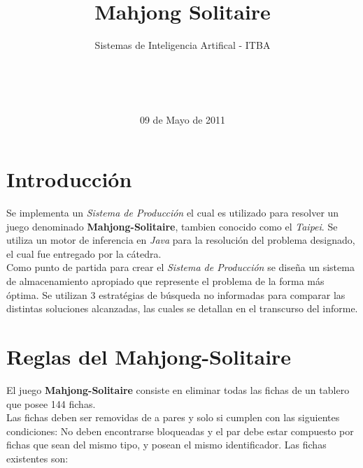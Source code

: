 \documentclass{sig-alternate}
\begin{document}

\title{Mahjong Solitaire}
\subtitle{Sistemas de Inteligencia Artifical - ITBA}


\author{
	\\
	\\
	\\
}

\date{09 de Mayo de 2011}

\maketitle

\section*{Introducci\'on}
	Se implementa un \textit{Sistema de Producci\'on} el cual es utilizado para resolver un juego denominado \textbf{Mahjong-Solitaire}, tambien conocido como el \textit{Taipei}. Se utiliza un motor de inferencia en \textit{Java} para la resoluci\'on del problema designado, el cual fue entregado por la c\'atedra. \\
	Como punto de partida para crear el \textit{Sistema de Producci\'on} se dise\~{n}a un sistema de almacenamiento apropiado que represente el problema de la forma m\'as \'optima. Se utilizan 3 estrat\'egias de b\'usqueda no informadas para comparar las distintas soluciones alcanzadas, las cuales se detallan en el transcurso del informe.

\section*{Reglas del Mahjong-Solitaire}
	El juego \textbf{Mahjong-Solitaire} consiste en eliminar todas las fichas de un tablero que posee 144 fichas. \\
	Las fichas deben ser removidas de a pares y solo si cumplen con las siguientes condiciones: No deben encontrarse bloqueadas y el par debe estar compuesto por fichas que sean del mismo tipo, y posean el mismo identificador. Las fichas existentes son:
\end{document}
